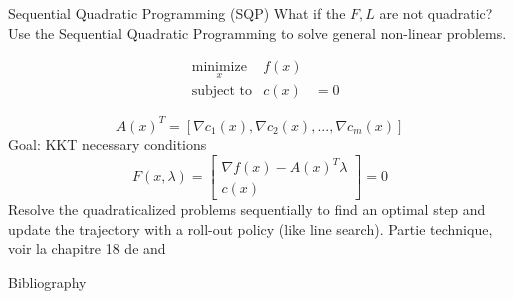 \documentclass{beamer}
\begin{document}
\begin{frame}	{Sequential Quadratic Programming (SQP)}
What if the $F, L$ are not quadratic? Use the Sequential Quadratic Programming to solve general non-linear problems.

\begin{equation}
\begin{aligned}
&\underset{x}{\text{minimize}}       &f(x) &\\
&\text{subject to}       &c(x) &= 0
\end{aligned}
\end{equation}

\begin{equation}
A(x)^T = [\nabla c_1(x), \nabla c_2(x),..., \nabla c_m(x)]
\end{equation}
Goal: KKT necessary conditions
\begin{equation}
F(x, \lambda) = \begin{bmatrix}
\nabla f(x) - A(x)^T \lambda \\
c(x)
\end{bmatrix} = 0
\end{equation}
Resolve the quadraticalized problems sequentially to find an optimal step and update the trajectory with a roll-out policy (like line search). 
\color{gray} \quad Partie technique, voir la chapitre 18 de  \cite{NoceWrig06} and \cite{crocoddyl}
\end{frame}

\begin{frame}{Bibliography}

{}

\end{frame}
\end{document}
